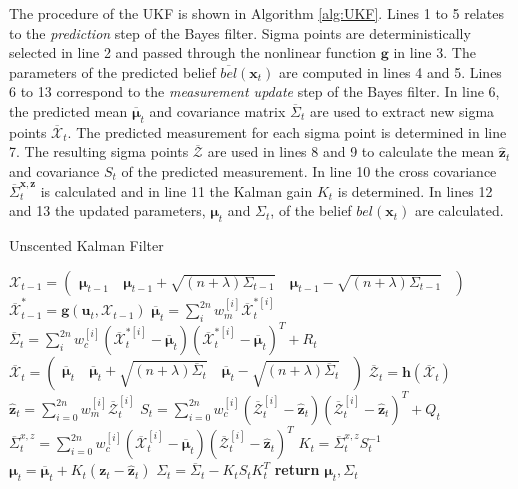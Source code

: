 \documentclass[12pt,oneside,openany,a4paper, %
afrikaans,english,
]{memoir}
\numberwithin{equation}{chapter}
\begin{document}
The procedure of the UKF is shown in Algorithm \ref{alg:UKF}. Lines 1 to 5 relates to the \textit{prediction} step of the Bayes filter. Sigma points are deterministically selected in line 2 and passed through the nonlinear function $\bm{g}$ in line 3. The parameters of the predicted belief $\overline{bel}(\bm{x}_t)$ are computed in lines 4 and 5. Lines 6 to 13 correspond to the \textit{measurement update} step of the Bayes filter. In line 6, the predicted mean $\overline{\bm{\mu}}_t$ and covariance matrix $\overline{\Sigma}_t$ are used to extract new sigma points $\overline{\mathcal{X}}_t$. The predicted measurement for each sigma point is determined in line 7. The resulting sigma points $\overline{\mathcal{Z}}$ are used in lines 8 and 9 to calculate the mean $\hat{\bm{z}}_t$ and covariance $S_t$ of the predicted measurement. In line 10 the cross covariance $\overline{\Sigma}_t^{\bm{x,z}}$ is calculated and in line 11 the Kalman gain $K_t$ is determined. In lines 12 and 13 the updated parameters, $\bm{\mu}_t$ and $\Sigma_t$, of the belief $bel(\bm{x}_t)$ are calculated.
\begin{algorithm}
\caption{Unscented Kalman Filter}\label{alg:UKF}
\begin{algorithmic}[1]
\State $\mathcal{X}_{t-1} = 
\begin{pmatrix}
\bm{\mu}_{t-1}  & \ \bm{\mu}_{t-1}+\sqrt{(n + \lambda)\Sigma_{t-1}} & \ \bm{\mu}_{t-1} - \sqrt{(n + \lambda)\Sigma_{t-1}}\ \ 
\end{pmatrix}
$ 
\State $\overline{\mathcal{X}}^*_{t-1} = \bm{g}(\bm{u}_t, \mathcal{X}_{t-1})$
\State $\bm{\overline{\mu}}_t = \sum_i^{2n} w_m^{[i]} \overline{\mathcal{X}}^{*[i]}_{t}$
\State $\overline{\Sigma}_t = \sum_i^{2n}w_c^{[i]}\left(\mathcal{\overline{X}}_t^{*[i]} - \overline{\bm{\mu}}_t\right)\left(\mathcal{\overline{X}}_t^{*[i]} - \overline{\bm{\mu}}_t\right)^T +R_t$
\State $\mathcal{\overline{X}}_t = 
\begin{pmatrix}
\bm{\overline{\mu}}_{t}  & \ \bm{\overline{\mu}}_{t}+\sqrt{(n + \lambda)\overline{\Sigma}_{t}} & \ \bm{\overline{\mu}}_{t} -  \sqrt{(n + \lambda)\overline{\Sigma}_{t}}\ \ 
\end{pmatrix}$
\State $\overline{\mathcal{Z}}_t = \bm{h}\left(\mathcal{\overline{X}}_t\right)$
\State $\hat{\bm{z}}_t = \sum_{i=0}^{2n}w_m^{[i]} \overline{\mathcal{Z}}_t^{[i]}$ 
\State $S_t = \sum_{i=0}^{2n} w_c^{[i]}\left( \overline{\mathcal{Z}}_t^{[i]} - \hat{\bm{z}}_t  \right)\left( \overline{\mathcal{Z}}_t^{[i]} - \hat{\bm{z}}_t  \right)^T + Q_t$
\State $\overline{\Sigma}_t^{x,z} = \sum_{i=0}^{2n}  w_c^{[i]}\left( \overline{\mathcal{X}}_t^{[i]} - \overline{\bm{\mu}}_t  \right)\left( \overline{\mathcal{Z}}_t^{[i]} - \hat{\bm{z}}_t  \right)^T $
\State $K_t = \overline{\Sigma}_t^{x,z}S_t^{-1}$
\State $\bm{\mu}_t = \overline{\bm{\mu}}_t + K_t(\bm{z}_t - \hat{\bm{z}}_t)$
\State $\Sigma_t = \overline{\Sigma}_t - K_tS_tK_t^T$
\State \textbf{return} $\bm{\mu}_t, \Sigma_t$
\EndProcedure
\end{algorithmic}
\end{algorithm}
\end{document}
